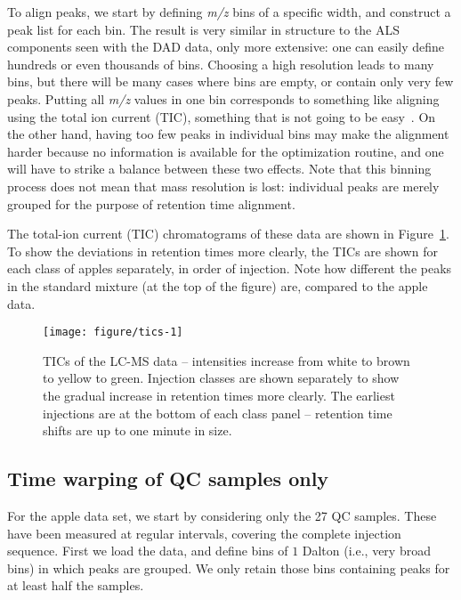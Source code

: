 \documentclass[a4paper,11pt]{article}\usepackage[]{graphicx}\usepackage[]{color}
\newenvironment{knitrout}{}{} %
\begin{document}
To align peaks, we start by defining \emph{m/z} bins of a specific
width, and construct a peak list for each bin. The result is very
similar in structure to the ALS components seen with the DAD data,
only more extensive: one can easily define hundreds or even thousands
of bins. Choosing a high resolution leads to many bins, but there
will be many cases where bins are empty, or contain only very few
peaks. Putting all \emph{m/z} values in one bin corresponds to
something like aligning using the total ion current (TIC), something
that is not going to be easy~\citep{Bloemberg2010}. On the other hand,
having too few peaks in individual bins may make the alignment 
harder because no information is available for the optimization
routine, and one will have to strike a balance between these two effects.
Note that this binning process does not mean that mass resolution is lost:
individual peaks are merely grouped for the purpose of retention time
alignment.

The total-ion current (TIC)
chromatograms of these data are shown in Figure~\ref{fig:tics}. To
show the deviations in retention times more clearly, the TICs are
shown for each class of apples separately, in order of injection. Note
how different the peaks in the standard mixture (at the top of the
figure) are, compared to the apple data.

\begin{figure}[tb]
\centering
\begin{knitrout}\small
{}\color{fgcolor}
\texttt{[image: figure/tics-1]} 
\end{knitrout}
\caption{TICs of the LC-MS data -- intensities increase from white to
  brown to yellow to green. Injection
  classes are shown separately to show the gradual increase in
  retention times more clearly. The earliest injections are at the
  bottom of each class panel -- retention time shifts are up to one
  minute in size.}
\label{fig:tics}
\end{figure}

\subsection{Time warping of QC samples only}
For the apple data set, we start by considering only the 27 QC
samples. These have been measured at regular intervals,
covering the complete injection sequence. First we load the data, and
define bins of $1$ Dalton (i.e., very broad bins) in which peaks are
grouped. We only retain those bins containing peaks for at least half
the samples.
\end{document}
